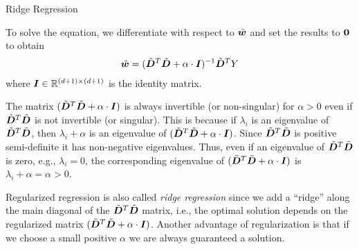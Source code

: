 \begin{frame}{Ridge Regression}

%

To solve the equation, we differentiate with respect to $\tilde{{\boldsymbol w}}$ and set the results to
$\mathbf{0}$ to obtain
\begin{align}
   \tilde{{\boldsymbol w}} = (\tilde{{\boldsymbol D}}^T\tilde{{\boldsymbol D}} + \alpha\cdot{\boldsymbol I})^{-1} \tilde{{\boldsymbol D}}^T Y
    \label{eq:reg:linear:ridge_w}
\end{align}
where ${\boldsymbol I} \in {\mathord{\mathbb R}}^{(d+1) \times (d+1)}$ is the identity matrix.

\medskip

The matrix $(\tilde{{\boldsymbol D}}^T\tilde{{\boldsymbol D}} + \alpha\cdot{\boldsymbol I})$ is always invertible (or
non-singular) for
$\alpha >
0$ even if $\tilde{{\boldsymbol D}}^T\tilde{{\boldsymbol D}}$ is not invertible (or singular). This is because if
$\lambda_i$ is an eigenvalue of $\tilde{{\boldsymbol D}}^T\tilde{{\boldsymbol D}}$, then $\lambda_i + \alpha$ is an
eigenvalue of $(\tilde{{\boldsymbol D}}^T\tilde{{\boldsymbol D}} + \alpha\cdot{\boldsymbol I})$. Since $\tilde{{\boldsymbol D}}^T\tilde{{\boldsymbol D}}$ is positive
semi-definite it has non-negative eigenvalues. Thus, even if an
eigenvalue of $\tilde{{\boldsymbol D}}^T\tilde{{\boldsymbol D}}$ is zero, e.g., $\lambda_i = 0$, the
corresponding eigenvalue of $(\tilde{{\boldsymbol D}}^T\tilde{{\boldsymbol D}} + \alpha\cdot {\boldsymbol I})$ is
$\lambda_i+\alpha = \alpha > 0$. 

\medskip

Regularized regression is also called {\em ridge regression} since we
add a ``ridge'' along the main diagonal of the $\tilde{{\boldsymbol D}}^T\tilde{{\boldsymbol D}}$ matrix, i.e.,
the optimal solution depends on the regularized matrix $(\tilde{{\boldsymbol D}}^T\tilde{{\boldsymbol D}} +
\alpha\cdot{\boldsymbol I})$. Another advantage of regularization is that if we
choose a small positive $\alpha$ we are always guaranteed a solution.
\end{frame}
